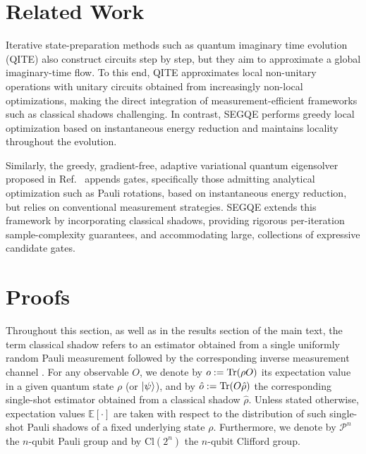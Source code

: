 \section{Related Work \label{appendix:related_works}}
Iterative state-preparation methods such as quantum imaginary time evolution (QITE) \cite{motta2020determining} also construct circuits step by step, but they aim to approximate a global imaginary-time flow. To this end, QITE approximates local non-unitary operations with unitary circuits obtained from increasingly non-local optimizations, making the direct integration of measurement-efficient frameworks such as classical shadows challenging. In contrast, SEGQE performs greedy local optimization based on instantaneous energy reduction and maintains locality throughout the evolution. 

Similarly, the greedy, gradient-free, adaptive variational quantum eigensolver proposed in Ref.~\cite{feniou2025greedy} appends gates, specifically those admitting analytical optimization such as Pauli rotations, based on instantaneous energy reduction, but relies on conventional measurement strategies. SEGQE extends this framework by incorporating classical shadows, providing rigorous per-iteration sample-complexity guarantees, and accommodating large, collections of expressive candidate gates.

\section{Proofs}
\label{appendix:proofs}
Throughout this section, as well as in the results section of the main text, the term classical shadow refers to an estimator obtained from a single uniformly random Pauli measurement followed by the corresponding inverse measurement channel \cite{huang2020predicting}. For any observable $O$, we denote by $o := \Tr(\rho O)$ its expectation value in a given quantum state $\rho$ (or $\ket{\psi}$), and by $\hat{o} := \Tr(O\hat{\rho})$ the corresponding single-shot estimator obtained from a classical shadow $\hat{\rho}$. Unless stated otherwise, expectation values $\mathbb{E}[\cdot]$ are taken with respect to the distribution of such single-shot Pauli shadows of a fixed underlying state $\rho$. Furthermore, we denote by $\mathcal{P}^{n}$ the $n$-qubit Pauli group and by $\mathrm{Cl}(2^n)$ the $n$-qubit Clifford group. 

